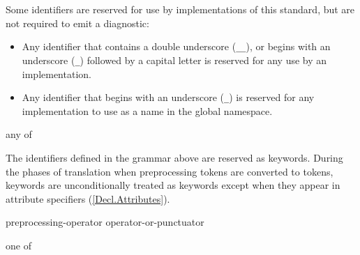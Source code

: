 \p Some identifiers are reserved for use by implementations of this standard,
but are not required to emit a diagnostic:

\begin{itemize}
  \item Any identifier that contains a double underscore (\texttt{\_\_}), or
  begins with an underscore (\texttt{\_}) followed by a capital letter is
  reserved for any use by an implementation.
  \item Any identifier that begins with an underscore (\texttt{\_}) is reserved
  for any implementation to use as a name in the global namespace.
\end{itemize}


\begin{grammar}
   \textnormal{any of}\br
  \br
  \br
  \br
  \br
  \br
  \br
  \br
  \br
\end{grammar}


\p The identifiers defined in the grammar above are reserved as keywords.
During the phases of translation when preprocessing tokens are converted to
tokens, keywords are unconditionally treated as keywords except when they appear
in attribute specifiers (\ref{Decl.Attributes}).


\begin{grammar}
  \br
    preprocessing-operator\br
    operator-or-punctuator

  \br
    \terminal{\#}\br
    \terminal{\#\#}

   \textnormal{one of}\br
    \br
    \br
    \terminal{! + - * / \% \^ \& |}\br
    \terminal{= += -= *= /= \%= \^= \&= |=}\br
    \terminal{== += < > <= >= \&\& ||}\br
    \terminal{<< >> <<= >>= ++ -- ,}
\end{grammar}

